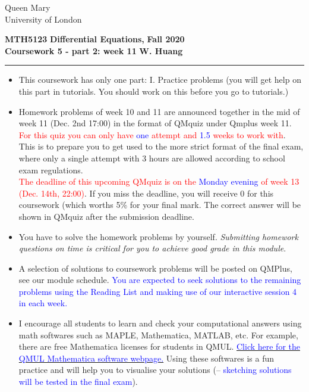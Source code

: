 \documentclass[11pt,a4paper,twoside]{article}
\begin{document}
	\begin{singlespace}
		\begin{center}
			\Huge Queen Mary\\
			\LARGE University of London
		\end{center}
		\Large \textbf{MTH5123} \hfill \Large \textbf{Differential Equations,} \hfill \Large \textbf{Fall 2020}\\
		\large \textbf{Coursework 5 - part 2: week 11} \hfill \large \textbf{W. Huang}
		\rule{\textwidth}{0.4pt}
	\end{singlespace}
	\begin{itemize}
		\item This coursework has only one part: I. Practice problems (you will get help on this part in tutorials. You should work on this before you go to tutorials.)
		\item Homework problems of week 10 and 11 are announced together in the mid of week 11 (Dec. 2nd 17:00) in the format of QMquiz under Qmplus week 11. \textcolor{red}{For this quiz you can only have} \textcolor{blue}{one} \textcolor{red}{attempt and} \textcolor{blue}{1.5} \textcolor{red}{weeks to work with}. This is to prepare you to get used to the more strict format of the final exam, where only a single attempt with 3 hours are allowed according to school exam regulations.\\
		\textcolor{red}{The deadline of this upcoming QMquiz is on the} \textcolor{blue}{Monday evening} \textcolor{red}{of week 13 (Dec. 14th, 22:00)}. If you miss the deadline, you will receive 0 for this coursework (which worths 5\% for your final mark. The correct answer will be shown in QMquiz after the submission deadline.
		\item You have to solve the homework problems by yourself. \textit{Submitting homework questions on time is critical for you to achieve good grade in this module}.
		\item A selection of solutions to coursework problems will be posted on QMPlus, see our module schedule. \textcolor{blue}{You are expected to seek solutions to the remaining problems using the Reading List and making use of our interactive session 4 in each week.}
		\item I encourage all students to learn and check your computational answers using math softwares such as MAPLE, Mathematica, MATLAB, etc. For example, there are free Mathematica licenses for students in QMUL. \href{https://www.its.qmul.ac.uk/services/service-catalogue/items/software---computational-mathematica.html}{\textcolor{blue}{Click here for the QMUL Mathematica software webpage.}} Using these softwares is a fun practice and will help you to visualise your solutions (– \textcolor{blue}{sketching solutions will be tested in the final exam}).
	\end{itemize}
\end{document}
